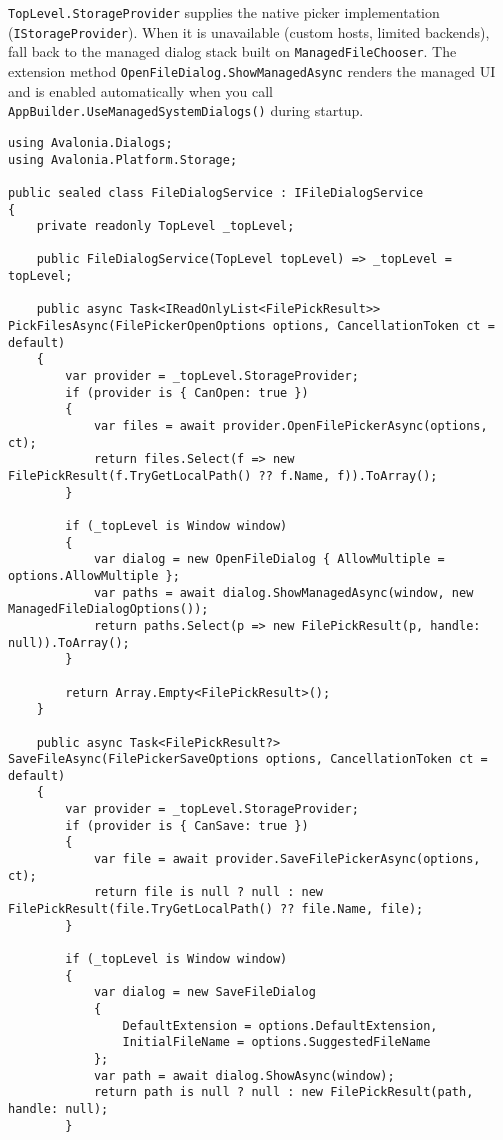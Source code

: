 \passthrough{\lstinline!TopLevel.StorageProvider!} supplies the native
picker implementation (\passthrough{\lstinline!IStorageProvider!}). When
it is unavailable (custom hosts, limited backends), fall back to the
managed dialog stack built on
\passthrough{\lstinline!ManagedFileChooser!}. The extension method
\passthrough{\lstinline!OpenFileDialog.ShowManagedAsync!} renders the
managed UI and is enabled automatically when you call
\passthrough{\lstinline!AppBuilder.UseManagedSystemDialogs()!} during
startup.

\begin{lstlisting}
using Avalonia.Dialogs;
using Avalonia.Platform.Storage;

public sealed class FileDialogService : IFileDialogService
{
    private readonly TopLevel _topLevel;

    public FileDialogService(TopLevel topLevel) => _topLevel = topLevel;

    public async Task<IReadOnlyList<FilePickResult>> PickFilesAsync(FilePickerOpenOptions options, CancellationToken ct = default)
    {
        var provider = _topLevel.StorageProvider;
        if (provider is { CanOpen: true })
        {
            var files = await provider.OpenFilePickerAsync(options, ct);
            return files.Select(f => new FilePickResult(f.TryGetLocalPath() ?? f.Name, f)).ToArray();
        }

        if (_topLevel is Window window)
        {
            var dialog = new OpenFileDialog { AllowMultiple = options.AllowMultiple };
            var paths = await dialog.ShowManagedAsync(window, new ManagedFileDialogOptions());
            return paths.Select(p => new FilePickResult(p, handle: null)).ToArray();
        }

        return Array.Empty<FilePickResult>();
    }

    public async Task<FilePickResult?> SaveFileAsync(FilePickerSaveOptions options, CancellationToken ct = default)
    {
        var provider = _topLevel.StorageProvider;
        if (provider is { CanSave: true })
        {
            var file = await provider.SaveFilePickerAsync(options, ct);
            return file is null ? null : new FilePickResult(file.TryGetLocalPath() ?? file.Name, file);
        }

        if (_topLevel is Window window)
        {
            var dialog = new SaveFileDialog
            {
                DefaultExtension = options.DefaultExtension,
                InitialFileName = options.SuggestedFileName
            };
            var path = await dialog.ShowAsync(window);
            return path is null ? null : new FilePickResult(path, handle: null);
        }


\end{lstlisting}
